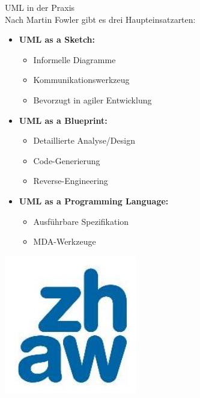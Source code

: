 \begin{concept}{UML in der Praxis}\\
Nach Martin Fowler gibt es drei Haupteinsatzarten:
\begin{itemize}
    \item \textbf{UML as a Sketch:}
    \begin{itemize}
        \item Informelle Diagramme
        \item Kommunikationswerkzeug
        \item Bevorzugt in agiler Entwicklung
    \end{itemize}
    \item \textbf{UML as a Blueprint:}
    \begin{itemize}
        \item Detaillierte Analyse/Design
        \item Code-Generierung
        \item Reverse-Engineering
    \end{itemize}
    \item \textbf{UML as a Programming Language:}
    \begin{itemize}
        \item Ausführbare Spezifikation
        \item MDA-Werkzeuge
    \end{itemize}
\end{itemize}
\includegraphics[width=0.9\linewidth]{images/2025_01_02_6eafa38dd4ae10c9a392g-10}
\end{concept}

